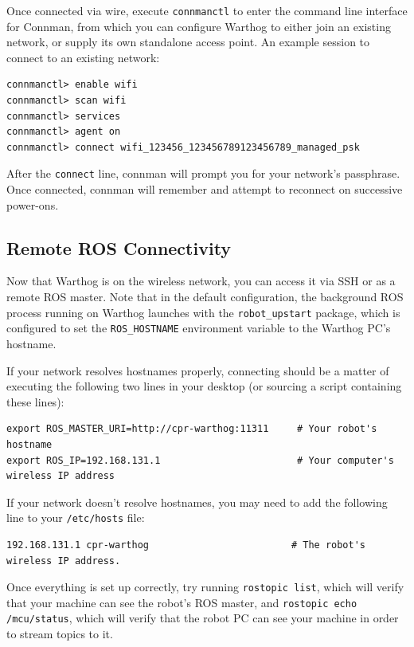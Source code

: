 \documentclass[]{clearpath-latex/clearpath-manual}
\begin{document}
Once connected via wire, execute \lstinline{connmanctl} to enter the command line interface for Connman, from which you can configure Warthog to either join an existing network, or supply its own standalone access point. An example session to connect to an existing network:

\begin{lstlisting}
connmanctl> enable wifi
connmanctl> scan wifi
connmanctl> services
connmanctl> agent on
connmanctl> connect wifi_123456_123456789123456789_managed_psk
\end{lstlisting}

After the \lstinline{connect} line, connman will prompt you for your network's passphrase. Once connected, connman will remember and attempt to reconnect on successive power-ons.


\pagebreak[4]
\subsection{Remote ROS Connectivity}

Now that Warthog is on the wireless network, you can access it via SSH or as a remote ROS master. Note that in the default configuration, the background ROS process running on Warthog launches with the \lstinline{robot_upstart} package, which is configured to set the \lstinline{ROS_HOSTNAME} environment variable to the Warthog PC's hostname.

If your network resolves hostnames properly, connecting should be a matter of executing the following two lines in your desktop (or sourcing a script containing these lines):

\begin{lstlisting}
export ROS_MASTER_URI=http://cpr-warthog:11311     # Your robot's hostname
export ROS_IP=192.168.131.1                        # Your computer's wireless IP address
\end{lstlisting}

If your network doesn't resolve hostnames, you may need to add the following line to your \lstinline{/etc/hosts} file:

\begin{lstlisting}
192.168.131.1 cpr-warthog                         # The robot's wireless IP address.
\end{lstlisting}

Once everything is set up correctly, try running \lstinline{rostopic list}, which will verify that your machine can see the robot's ROS master, and \lstinline{rostopic echo /mcu/status}, which will verify that the robot PC can see your machine in order to stream topics to it.
\end{document}
